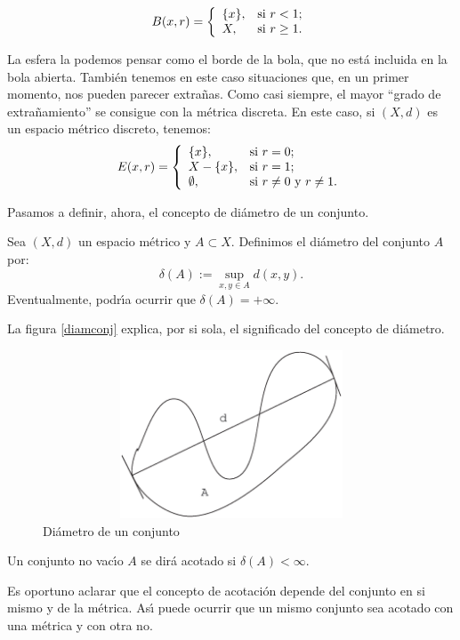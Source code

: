 \[B(x,r)=\left\{
\begin{array}{ll}
	\{x\}, & \hbox{si $r<1$;} \\
	X, & \hbox{si $r\geq 1$.} \\
\end{array}
\right.
\]

La esfera la podemos pensar como el borde de la bola, que no
est\'a incluida en la bola abierta. Tambi\'en tenemos en este caso
situaciones que, en un primer momento, nos pueden parecer
extra\~nas. Como casi siempre, el mayor ``grado de
extra\~namiento'' se consigue con la m\'etrica discreta. En este
caso, si $(X,d)$ es un espacio m\'etrico discreto, tenemos:
\[E(x,r)=\left\{
\begin{array}{ll}
	\{x\}, & \hbox{si $r=0$;} \\
	X-\{x\}, & \hbox{si $r=1$;} \\
	\emptyset, & \hbox{si $r\neq 0$ y $r\neq 1$.} \\
\end{array}
\right.
\]

Pasamos a definir, ahora, el concepto de di\'ametro de un
conjunto.

\begin{definicion} Sea $(X,d)$ un espacio m\'etrico y $A\subset
X$. Definimos el di\'ametro del conjunto $A$ por:
\[
	\delta(A):=\sup\limits_{x,y\in A}d(x,y).
\]
Eventualmente, podr\'{\i}a ocurrir que $\delta(A)=+\infty$.
\end{definicion}
La figura \vref{diamconj} explica, por si sola, el significado del
concepto de di\'ametro.




\begin{figure}



\begin{center}
	\includegraphics[height=5cm, width=12cm]{diam.eps}
	\caption{Di\'ametro de un conjunto}\label{diamconj}
\end{center}
\end{figure}
\begin{definicion} Un conjunto no vac\'{\i}o $A$ se dir\'a acotado si
$\delta(A)<\infty$.
\end{definicion}
Es oportuno aclarar que el concepto de acotaci\'on depende del
conjunto en si mismo y de la m\'etrica. As\'{\i} puede ocurrir que
un mismo conjunto sea acotado con una m\'etrica y con otra no.

